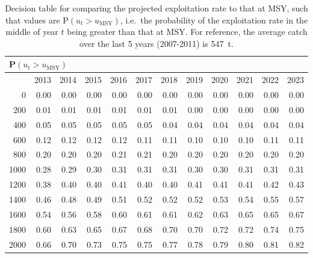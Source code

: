 \begin{table}[ht]
\begin{center}
\caption{Decision table for comparing the projected exploitation rate to that at MSY, such that values are P$(u_t > u_\mathrm{MSY})$, i.e.~the probability of the exploitation rate in the middle of year $t$ being greater than that at MSY. For reference, the average catch over the last 5 years (2007-2011) is 547~t.}
\label{tab:umsy.10yr}
\begin{tabular}{rrrrrrrrrrrr}
\multicolumn{12}{l}{P$(u_t > u_\mathrm{MSY})$} \\
  \hline
       & 2013 & 2014 & 2015 & 2016 & 2017 & 2018 & 2019 & 2020 & 2021 & 2022 & 2023 \\ 
  \hline
     0 & 0.00 & 0.00 & 0.00 & 0.00 & 0.00 & 0.00 & 0.00 & 0.00 & 0.00 & 0.00 & 0.00 \\ 
   200 & 0.01 & 0.01 & 0.01 & 0.01 & 0.01 & 0.01 & 0.00 & 0.00 & 0.00 & 0.00 & 0.00 \\ 
   400 & 0.05 & 0.05 & 0.05 & 0.05 & 0.05 & 0.04 & 0.04 & 0.04 & 0.04 & 0.04 & 0.04 \\ 
   600 & 0.12 & 0.12 & 0.12 & 0.12 & 0.11 & 0.11 & 0.10 & 0.10 & 0.10 & 0.11 & 0.11 \\ 
   800 & 0.20 & 0.20 & 0.20 & 0.21 & 0.21 & 0.20 & 0.20 & 0.20 & 0.20 & 0.20 & 0.20 \\ 
  1000 & 0.28 & 0.29 & 0.30 & 0.31 & 0.31 & 0.31 & 0.30 & 0.30 & 0.31 & 0.31 & 0.31 \\ 
  1200 & 0.38 & 0.40 & 0.40 & 0.41 & 0.40 & 0.40 & 0.41 & 0.41 & 0.41 & 0.42 & 0.43 \\ 
  1400 & 0.46 & 0.48 & 0.49 & 0.51 & 0.52 & 0.52 & 0.52 & 0.53 & 0.54 & 0.55 & 0.57 \\ 
  1600 & 0.54 & 0.56 & 0.58 & 0.60 & 0.61 & 0.61 & 0.62 & 0.63 & 0.65 & 0.65 & 0.67 \\ 
  1800 & 0.60 & 0.63 & 0.65 & 0.67 & 0.68 & 0.70 & 0.70 & 0.72 & 0.72 & 0.74 & 0.75 \\ 
  2000 & 0.66 & 0.70 & 0.73 & 0.75 & 0.75 & 0.77 & 0.78 & 0.79 & 0.80 & 0.81 & 0.82 \\ 
   \hline
\end{tabular}
\end{center}
\end{table}

\clearpage
